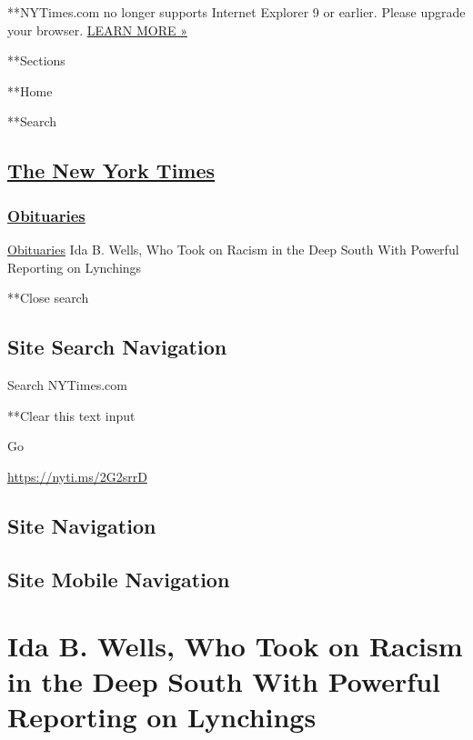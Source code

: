  **NYTimes.com no longer supports Internet Explorer 9 or earlier. Please
upgrade your browser.
\href{http://www.nytimes3xbfgragh.onion/content/help/site/ie9-support.html}{LEARN
MORE »}

**Sections

**Home

**Search

\hypertarget{the-new-york-times}{%
\subsection{\texorpdfstring{\href{http://www.nytimes3xbfgragh.onion/}{The
New York Times}}{The New York Times}}\label{the-new-york-times}}

\hypertarget{-obituaries-}{%
\subsubsection{\texorpdfstring{
\href{https://www.nytimes3xbfgragh.onion/section/obituaries}{Obituaries}
}{ Obituaries }}\label{-obituaries-}}


\href{https://www.nytimes3xbfgragh.onion/section/obituaries}{Obituaries}
\textbar{}Ida B. Wells, Who Took on Racism in the Deep South With
Powerful Reporting on Lynchings

**Close search

\hypertarget{site-search-navigation}{%
\subsection{Site Search Navigation}\label{site-search-navigation}}

Search NYTimes.com

**Clear this text input

Go

\url{https://nyti.ms/2G2srrD}

\hypertarget{site-navigation}{%
\subsection{Site Navigation}\label{site-navigation}}

\hypertarget{site-mobile-navigation}{%
\subsection{Site Mobile Navigation}\label{site-mobile-navigation}}

\hypertarget{ida-b-wells-who-took-on-racism-in-the-deep-south-with-powerful-reporting-on-lynchings}{%
\section{Ida B. Wells, Who Took on Racism in the Deep South With
Powerful Reporting on
Lynchings}\label{ida-b-wells-who-took-on-racism-in-the-deep-south-with-powerful-reporting-on-lynchings}}

